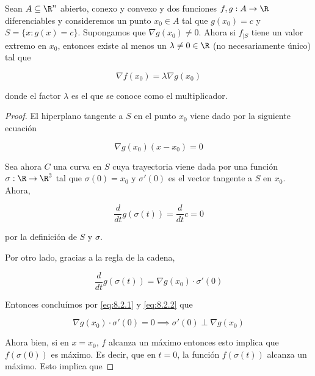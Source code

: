 \begin{teo}\label{teo:lagrange}
    Sean $A \subseteq \R^n$ abierto, conexo y convexo y dos funciones $f, g: A \rightarrow \R$ diferenciables y consideremos un punto $x_0 \in A$ tal que $g(x_0) = c$ y $S = \{x : g(x) = c\}$. Supongamos que $\nabla g(x_0) \neq 0$. Ahora si $f_{|S}$ tiene un valor extremo en $x_0$, entonces existe al menos un $\lambda \neq 0 \in \R$ (no necesariamente único) tal que
    
    \[
    \nabla f(x_0) = \lambda \nabla g(x_0)
    \]
    
    \noindent donde el factor $\lambda$ es el que se conoce como el multiplicador.
\end{teo}

\begin{proof}
    El hiperplano tangente a $S$ en el punto $x_0$ viene dado por la siguiente ecuación
    
    \[
    \nabla g(x_0) (x-x_0) = 0
    \]
    
    Sea ahora $C$ una curva en $S$ cuya trayectoria viene dada por una función $\sigma: \R \rightarrow \R^3$ tal que $\sigma(0) = x_0$ y $\sigma'(0)$ es el vector tangente a $S$ en $x_0$. Ahora,
    
    \begin{equation}\label{eq:8.2.1}
        \frac{d}{dt} g\left( \sigma(t) \right) = \frac{d}{dt} c = 0
    \end{equation}
    
    \noindent por la definición de $S$ y $\sigma$.
    
    Por otro lado, gracias a la regla de la cadena,
    
    \begin{equation}\label{eq:8.2.2}
        \frac{d}{dt} g\left( \sigma(t) \right) = \nabla g(x_0) \cdot \sigma'(0)
    \end{equation}
    
    Entonces concluímos por \ref{eq:8.2.1} y \ref{eq:8.2.2} que
    
    \begin{equation}\label{eq:8.2.3}
        \nabla g(x_0) \cdot \sigma'(0) = 0 \implies \sigma'(0) \perp \nabla g(x_0)
    \end{equation}
    
    Ahora bien, si en $x = x_0$, $f$ alcanza un máximo entonces esto implica que $f\left( \sigma(0) \right)$ es máximo. Es decir, que en $t = 0$, la función $f\left( \sigma(t) \right)$ alcanza un máximo. Esto implica que
    

\end{proof}
